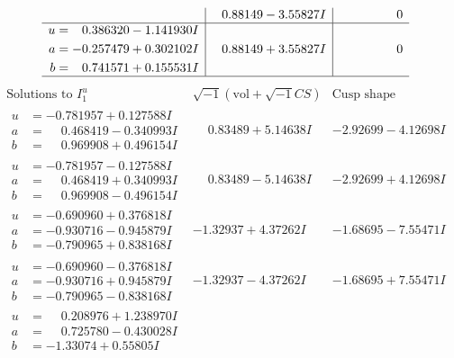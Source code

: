 \documentclass[1p]{elsarticle_modified}
\theoremstyle{definition}
\newcommand{\I}{\sqrt{-1}}
\begin{document}
$$\begin{array}{c|c|c}
 & \phantom{-}0.88149 - 3.55827 I & \phantom{-0.000000 } 0 \\ \hline\begin{aligned}
u &= \phantom{-}0.386320 - 1.141930 I \\
a &= -0.257479 + 0.302102 I \\
b &= \phantom{-}0.741571 + 0.155531 I\end{aligned}
 & \phantom{-}0.88149 + 3.55827 I & \phantom{-0.000000 } 0\\
 \hline 
 \end{array}$$\newpage$$\begin{array}{c|c|c}  
\text{Solutions to }I^u_{1}& \I (\text{vol} + \sqrt{-1}CS) & \text{Cusp shape}\\
 \hline 
\begin{aligned}
u &= -0.781957 + 0.127588 I \\
a &= \phantom{-}0.468419 - 0.340993 I \\
b &= \phantom{-}0.969908 + 0.496154 I\end{aligned}
 & \phantom{-}0.83489 + 5.14638 I & -2.92699 - 4.12698 I \\ \hline\begin{aligned}
u &= -0.781957 - 0.127588 I \\
a &= \phantom{-}0.468419 + 0.340993 I \\
b &= \phantom{-}0.969908 - 0.496154 I\end{aligned}
 & \phantom{-}0.83489 - 5.14638 I & -2.92699 + 4.12698 I \\ \hline\begin{aligned}
u &= -0.690960 + 0.376818 I \\
a &= -0.930716 - 0.945879 I \\
b &= -0.790965 + 0.838168 I\end{aligned}
 & -1.32937 + 4.37262 I & -1.68695 - 7.55471 I \\ \hline\begin{aligned}
u &= -0.690960 - 0.376818 I \\
a &= -0.930716 + 0.945879 I \\
b &= -0.790965 - 0.838168 I\end{aligned}
 & -1.32937 - 4.37262 I & -1.68695 + 7.55471 I \\ \hline\begin{aligned}
u &= \phantom{-}0.208976 + 1.238970 I \\
a &= \phantom{-}0.725780 - 0.430028 I \\
b &= -1.33074 + 0.55805 I\end{aligned}

\end{array}$$
\end{document}
